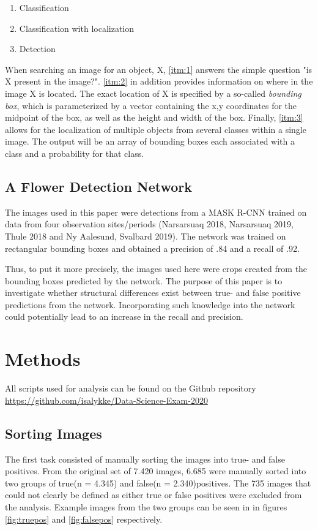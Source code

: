 \documentclass[12pt]{article}
\begin{document}
\begin{enumerate}
	\item Classification\label{itm:1}
	\item Classification with localization\label{itm:2}
	\item Detection\label{itm:3}
\end{enumerate}

When searching an image for an object, X, \ref{itm:1} answers the simple question "is X present in the image?". \ref{itm:2} in addition provides information on where in the image X is located. The exact location of X is specified by a so-called \textit{bounding box}, which is parameterized by a vector containing the x,y coordinates for the midpoint of the box, as well as the height and width of the box. Finally, \ref{itm:3} allows for the localization of multiple objects from several classes within a single image. The output will be an array of bounding boxes each associated with a class and a probability for that class.

\subsection{A Flower Detection Network}
The images used in this paper were detections from a MASK R-CNN trained on data from four observation sites/periods (Narsarsuaq 2018, Narsarsuaq 2019, Thule 2018 and Ny Aalesund, Svalbard 2019). The network was trained on rectangular bounding boxes and obtained a precision of .84 and a recall of .92. 

Thus, to put it more precisely, the images used here were crops created from the bounding boxes predicted by the network. The purpose of this paper is to investigate whether structural differences exist between true- and false positive predictions from the network. Incorporating such knowledge into the network could potentially lead to an increase in the recall and precision.


\section{Methods}
All scripts used for analysis can be found on the Github repository \url{https://github.com/isalykke/Data-Science-Exam-2020}

\subsection{Sorting Images}
The first task consisted of manually sorting the images into true- and false positives. 
From the original set of 7.420 images, 6.685 were manually sorted into two groups of true(n = 4.345) and false(n = 2.340)positives. The 735 images that could not clearly be defined as either true or false positives were excluded from the analysis. Example images from the two groups can be seen in in figures \ref{fig:truepos} and \ref{fig:falsepos} respectively.
\end{document}
